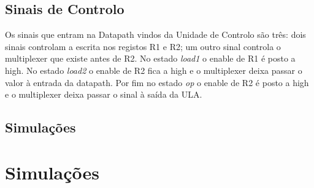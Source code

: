 \documentclass[a4paper]{article}
\begin{document}
\subsection{Sinais de Controlo}
Os sinais que entram na Datapath vindos da Unidade de Controlo são três: dois sinais controlam a escrita nos registos R1 e R2; um outro sinal controla o multiplexer que existe antes de R2. No estado \textit{load1} o enable de R1 é posto a high. No estado \textit{load2} o enable de R2 fica a high e o multiplexer deixa passar o valor à entrada da datapath. Por fim no estado \textit{op} o enable de R2 é posto a high e o multiplexer deixa passar o sinal à saída da ULA.

\pagebreak
\subsection{Simulações}
\pagebreak


\section{Simulações}
\end{document}
